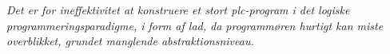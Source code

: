 \noindent \textit{Det er for ineffektivitet at konstruere et stort \gls{plc}-program i det logiske programmeringsparadigme, i form af \gls{lad}, da programmøren hurtigt kan miste overblikket, grundet manglende abstraktionsniveau.}


















